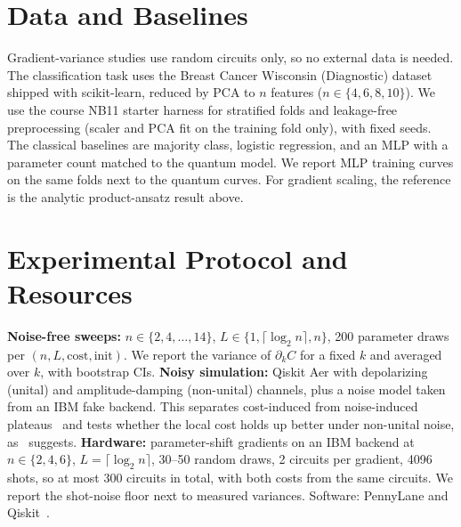 \documentclass[conference]{IEEEtran}
\begin{document}
\section{Data and Baselines}
Gradient-variance studies use random circuits only, so no external data is
needed. The classification task uses the Breast Cancer Wisconsin (Diagnostic)
dataset shipped with scikit-learn, reduced by PCA to $n$ features
($n\in\{4,6,8,10\}$). We use the course NB11 starter harness for stratified
folds and leakage-free preprocessing (scaler and PCA fit on the training fold
only), with fixed seeds. The classical baselines are majority class, logistic
regression, and an MLP with a parameter count matched to the quantum model. We
report MLP training curves on the same folds next to the quantum curves. For
gradient scaling, the reference is the analytic product-ansatz result above.

\section{Experimental Protocol and Resources}
\textbf{Noise-free sweeps:} $n\in\{2,4,\dots,14\}$, $L\in\{1,\lceil\log_2 n\rceil, n\}$,
200 parameter draws per $(n,L,\text{cost},\text{init})$. We report the variance of
$\partial_k C$ for a fixed $k$ and averaged over $k$, with bootstrap CIs.
\textbf{Noisy simulation:} Qiskit Aer with depolarizing (unital) and
amplitude-damping (non-unital) channels, plus a noise model taken from an IBM
fake backend. This separates cost-induced from noise-induced
plateaus~\cite{wang2021,singkanipa2025} and tests whether the local cost
holds up better under non-unital noise, as~\cite{mele2026} suggests.
\textbf{Hardware:} parameter-shift gradients on an IBM backend at
$n\in\{2,4,6\}$, $L=\lceil\log_2 n\rceil$, 30--50 random draws, 2 circuits per
gradient, 4096 shots, so at most 300 circuits in total, with both costs from
the same circuits. We report the shot-noise floor next to measured variances.
Software: PennyLane and Qiskit~\cite{qiskit2024}.
\end{document}
